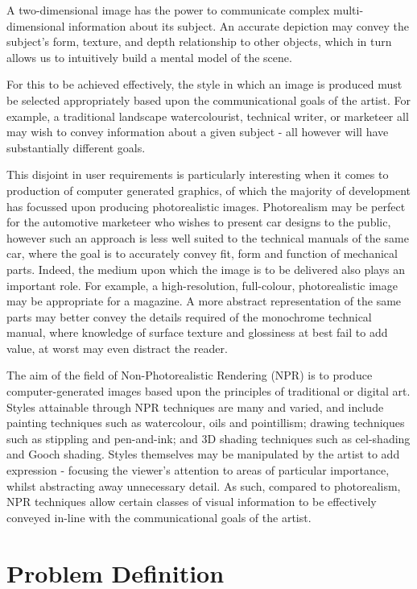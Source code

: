 A two-dimensional image has the power to communicate complex multi-dimensional information about its subject.
An accurate depiction may convey the subject's form, texture, and depth relationship to other objects, which in turn allows us to intuitively build a mental model of the scene.

For this to be achieved effectively, the style in which an image is produced must be selected appropriately based upon the communicational goals of the artist.
For example, a traditional landscape watercolourist, technical writer, or marketeer all may wish to convey information about a given subject - all however will have substantially different goals.

This disjoint in user requirements is particularly interesting when it comes to production of computer generated graphics, of which the majority of development has focussed upon producing photorealistic images.
Photorealism may be perfect for the automotive marketeer who wishes to present car designs to the public, however such an approach is less well suited to the technical manuals of the same car, where the goal is to accurately convey fit, form and function of mechanical parts.
Indeed, the medium upon which the image is to be delivered also plays an important role.
For example, a high-resolution, full-colour, photorealistic image may be appropriate for a magazine. 
A more abstract representation of the same parts may better convey the details required of the monochrome technical manual, where knowledge of surface texture and glossiness at best fail to add value, at worst may even distract the reader.

The aim of the field of Non-Photorealistic Rendering (NPR) is to produce computer-generated images based upon the principles of traditional or digital art.
Styles attainable through NPR techniques are many and varied, and include painting techniques such as watercolour, oils and pointillism; drawing techniques such as stippling and pen-and-ink; and 3D shading techniques such as cel-shading and Gooch shading.
Styles themselves may be manipulated by the artist to add expression - focusing the viewer's attention to areas of particular importance, whilst abstracting away unnecessary detail.
As such, compared to photorealism, NPR techniques allow certain classes of visual information to be effectively conveyed in-line with the communicational goals of the artist.

\section{Problem Definition}

